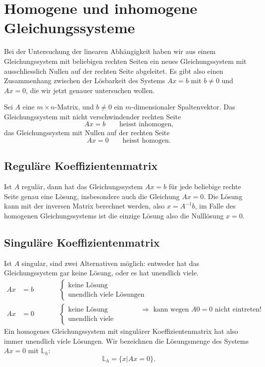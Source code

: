 %
%
%
\section{Homogene und inhomogene Gleichungssysteme}
Bei der Untersuchung der linearen Abhängigkeit haben wir aus einem
Gleichungssystem mit beliebigen rechten Seiten ein neues Gleichungssystem
mit ausschliesslich Nullen auf der rechten Seite abgeleitet.
Es gibt also einen Zusammenhang zwischen der Lösbarkeit des Systems 
$Ax=b$ mit $b\ne 0$ und $Ax=0$, die wir jetzt genauer untersuchen
wollen.
\begin{definition}
Sei $A$ eine $m\times n$-Matrix, und $b\ne 0$ ein $m$-dimensionaler
Spaltenvektor.
Das Gleichungssystem mit nicht verschwindender rechten Seite
\[
Ax=b\qquad\text{heisst inhomogen,}
\]
das Gleichungssystem mit Nullen auf der rechten Seite 
\[
Ax=0\qquad\text{heisst homogen.}
\]
\end{definition}
\subsection{Reguläre Koeffizientenmatrix}
Ist $A$ regulär, dann hat das Gleichungssystem $Ax=b$ für jede beliebige
rechte Seite genau eine Lösung, insbesondere auch die Gleichung $Ax=0$.
Die Lösung kann mit der inversen Matrix berechnet werden, also $x=A^{-1}b$,
im Falle des homogenen Gleichungssystems ist die einzige Lösung also
die Nulllösung $x=0$.

\subsection{Singuläre Koeffizientenmatrix}
Ist $A$ singular, sind zwei Alternativen möglich: entweder hat das
Gleichungssystem gar keine Lösung, oder es hat unendlich viele.
\begin{align*}
Ax&=b&\qquad&\begin{cases}
\text{keine Lösung}\\
\text{unendlich viele Lösungen}
\end{cases}
\\
Ax&=0&\qquad&\begin{cases}
\text{keine Lösung}&\text{$\Rightarrow$ kann wegen $A0=0$ nicht eintreten!}\\
\text{unendlich viele Lösungen}&
\end{cases}
\end{align*}
Ein homogenes Gleichungssystem mit singulärer Koeffizientenmatrix hat also
immer unendlich viele Lösungen.
Wir bezeichnen die Lösungsmenge des Systems $Ax=0$ mit $\mathbb L_h$:
\[
\mathbb L_h=\{x|Ax=0\}.
\]

